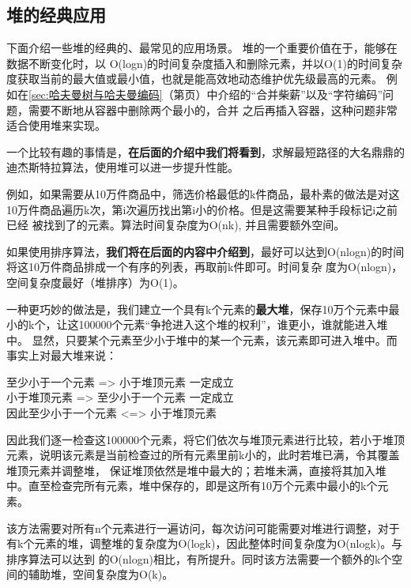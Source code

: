 \subsection{堆的经典应用}
下面介绍一些堆的经典的、最常见的应用场景。
堆的一个重要价值在于，能够在数据不断变化时，以 O(logn)的时间复杂度插入和删除元素，并以O(1)的时间复杂度获取当前的最大值或最小值，也就是能高效地动态维护优先级最高的元素。
例如在\ref{sec:哈夫曼树与哈夫曼编码}（第\pageref{sec:哈夫曼树与哈夫曼编码}页）中介绍的“合并柴薪”以及“字符编码”问题，需要不断地从容器中删除两个最小的，合并
之后再插入容器，这种问题非常适合使用堆来实现。

一个比较有趣的事情是，{\color{red}\textbf{在后面的介绍中我们将看到}}，求解最短路径的大名鼎鼎的迪杰斯特拉算法，使用堆可以进一步提升性能。

例如，如果需要从10万件商品中，筛选价格最低的k件商品，最朴素的做法是对这10万件商品遍历k次，第i次遍历找出第i小的价格。但是这需要某种手段标记i之前已经
被找到了的元素。算法时间复杂度为O(nk), 并且需要额外空间。

如果使用排序算法，{\color{red}\textbf{我们将在后面的内容中介绍到}}，最好可以达到O(nlogn)的时间将这10万件商品排成一个有序的列表，再取前k件即可。时间复杂
度为O(nlogn)，空间复杂度最好（堆排序）为O(1)。

一种更巧妙的做法是，我们建立一个具有k个元素的\textbf{最大堆}，保存10万个元素中最小的k个，让这100000个元素“争抢进入这个堆的权利”，谁更小，谁就能进入堆中。
显然，只要某个元素至少小于堆中的某一个元素，该元素即可进入堆中。而事实上对最大堆来说：
\begin{bulk}
    \begin{center}
        至少小于一个元素 => 小于堆顶元素    一定成立\\[0.6em]
        小于堆顶元素 => 至少小于一个元素    一定成立\\[0.6em]
        因此至少小于一个元素 <=> 小于堆顶元素
    \end{center}
\end{bulk}
因此我们逐一检查这100000个元素，将它们依次与堆顶元素进行比较，若小于堆顶元素，说明该元素是当前检查过的所有元素里前k小的，此时若堆已满，令其覆盖堆顶元素并调整堆，
保证堆顶依然是堆中最大的；若堆未满，直接将其加入堆中。直至检查完所有元素，堆中保存的，即是这所有10万个元素中最小的k个元素。

该方法需要对所有n个元素进行一遍访问，每次访问可能需要对堆进行调整，对于有k个元素的堆，调整堆的复杂度为O(logk)，因此整体时间复杂度为O(nlogk)。与排序算法可以达到
的O(nlogn)相比，有所提升。同时该方法需要一个额外的k个空间的辅助堆，空间复杂度为O(k)。

